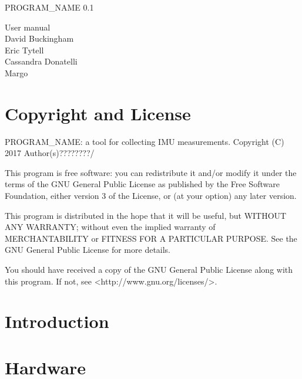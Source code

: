 \documentclass[11pt,letterpaper,article,oneside]{memoir}
\newcommand{\name}{PROGRAM\_NAME}
\newcommand{\version}{0.1}
\begin{document}
\thispagestyle{empty}

{%
\centering
\Large

\vspace*{\fill}

{\huge
\name{} \version
}

{\LARGE
User manual \\
\vspace{2.5cm}
David Buckingham \\
Eric Tytell \\
Cassandra Donatelli \\
Margo \\
}
\vspace*{\fill}

}

\cleardoublepage

\tableofcontents*

\clearpage


\section{Copyright and License}

\name{}: a tool for collecting IMU measurements.
Copyright (C) 2017 Author(s)????????/

This program is free software: you can redistribute it and/or modify
it under the terms of the GNU General Public License as published by
the Free Software Foundation, either version 3 of the License, or
(at your option) any later version.

This program is distributed in the hope that it will be useful,
but WITHOUT ANY WARRANTY; without even the implied warranty of
MERCHANTABILITY or FITNESS FOR A PARTICULAR PURPOSE.  See the
GNU General Public License for more details.

You should have received a copy of the GNU General Public License
along with this program.  If not, see <http://www.gnu.org/licenses/>.

\section{Introduction}




\section{Hardware}
\end{document}
